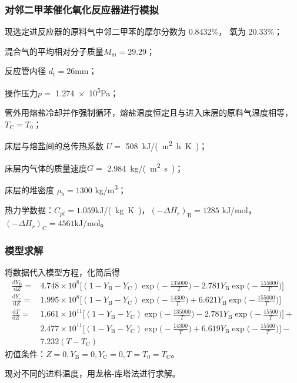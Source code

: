 \begin{frame}
    \frametitle{对邻二甲苯催化氧化反应器进行模拟}
    现选定进反应器的原料气中邻二甲苯的摩尔分数为 0.8432\%， 氧为 20.33\%；
    
    混合气的平均相对分子质量$M_\mathrm{m}=29.29$；
    
    反应管内径 $d_\mathrm{t}=26$mm；
    
    操作压力$p=$ \num{1.274e5}Pa；
    
    管外用熔盐冷却并作强制循环，熔盐温度恒定且与进入床层的原料气温度相等，$T_\mathrm{C} = T_0$；
    
    床层与熔盐间的总传热系数 $U=$ \SI{508}{kJ/(m^2.h.K)}；
    
    床层内气体的质量速度$G=$ \SI{2.984}{kg/(m^2.s)}；
    
    床层的堆密度 $\rho_{\mathrm{b}}= 1300$ \si{kg/m^3}；
    
    热力学数据：$C_{pt}= 1. 059$\si{kJ/(kg.K)}，$(-\Delta H_{r})_{\mathrm{B}}=1285$ kJ/mol， $(-\Delta H_{r})_{\mathrm{C}}=4561$kJ/mol。 
\end{frame}


\begin{frame}
    \frametitle{模型求解}
    将数据代入模型方程，化简后得
    \[
        \begin{aligned}
                \frac{\mathrm{d}Y_{\mathrm{B}}}{\mathrm{d}Z}=&4.748\times10^{8}\bigg[(1-Y_{\mathrm{B}}-Y_{\mathrm{C}})\exp\bigg(-\frac{135000}{T}\bigg)-2.781Y_{\mathrm{B}}\exp\bigg(-\frac{155000}{T}\bigg)\bigg]  \\
                \frac{\mathrm{d}Y_{\mathrm{c}}}{\mathrm{d}Z}=&1.995\times10^{8}\Big[(1-Y_{\mathrm{B}}-Y_{\mathrm{C}})\exp\Big(-\frac{14300}{T}\Big)+6.621Y_{\mathrm{B}}\exp\Big(-\frac{155000}{T}\Big)\Big]  \\
                \frac{\mathrm{d}T}{\mathrm{d}Z}=&1.661\times10^{11}\Big[(1-Y_{\mathrm{B}}-Y_{\mathrm{C}})\exp\Big(-\frac{135000}{T}\Big)-2.781Y_{\mathrm{B}}\exp\Big(-\frac{15500}{T}\Big)\Big]+  \\
                &2.477\times10^{11}\Big[(1-Y_{\mathrm{B}}-Y_{\mathrm{C}})\exp\Big(-\frac{14300}{T}\Big)+6.619Y_{\mathrm{B}}\exp\Big(-\frac{15500}{T}\Big)\Big]- \\
                &7.232(T-T_{\mathrm{C}})
        \end{aligned}
    \]
    初值条件：$Z=0, Y_\mathrm{B}=0, Y_\mathrm{C}=0, T=T_0=T_\mathrm{C}$。

    现对不同的进料温度，用龙格-库塔法进行求解。
\end{frame}


